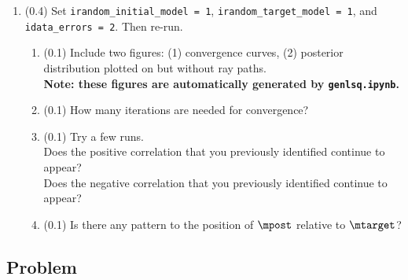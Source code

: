 \documentclass[11pt,titlepage,fleqn]{article}
\begin{document}
\begin{enumerate}

\item (0.4) Set \verb+irandom_initial_model = 1+, \verb+irandom_target_model = 1+, and \verb+idata_errors = 2+. Then re-run.
%
\begin{enumerate}
\item (0.1) Include two figures: (1) convergence curves, (2) posterior distribution plotted on  but without ray paths. \\
{\bf Note: these figures are automatically generated by \verb+genlsq.ipynb+.}
\item (0.1) How many iterations are needed for convergence?
\item (0.1) Try a few runs. \\
Does the positive correlation that you previously identified continue to appear? \\
Does the negative correlation that you previously identified continue to appear?
\item (0.1) Is there any pattern to the position of $\mpost$ relative to $\mtarget$?
\end{enumerate}

\end{enumerate}



\subsection*{Problem} \howmuchtime\




\clearpage\pagebreak


\end{document}
